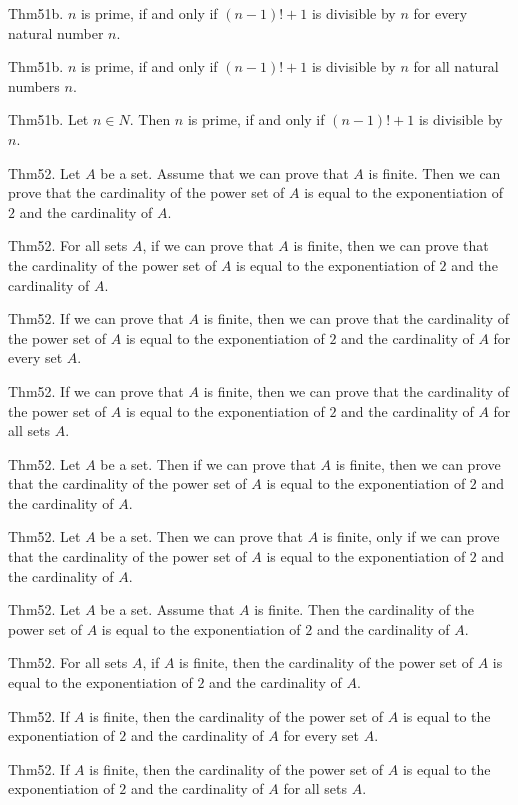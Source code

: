 \documentclass{article}
\begin{document}
Thm51b. $n$ is prime, if and only if $(n - 1)! + 1$ is divisible by $n$ for every natural number $n$.

Thm51b. $n$ is prime, if and only if $(n - 1)! + 1$ is divisible by $n$ for all natural numbers $n$.

Thm51b. Let $n \in N$. Then $n$ is prime, if and only if $(n - 1)! + 1$ is divisible by $n$.

Thm52. Let $A$ be a set. Assume that we can prove that $A$ is finite. Then we can prove that the cardinality of the power set of $A$ is equal to the exponentiation of $2$ and the cardinality of $A$.

Thm52. For all sets $A$, if we can prove that $A$ is finite, then we can prove that the cardinality of the power set of $A$ is equal to the exponentiation of $2$ and the cardinality of $A$.

Thm52. If we can prove that $A$ is finite, then we can prove that the cardinality of the power set of $A$ is equal to the exponentiation of $2$ and the cardinality of $A$ for every set $A$.

Thm52. If we can prove that $A$ is finite, then we can prove that the cardinality of the power set of $A$ is equal to the exponentiation of $2$ and the cardinality of $A$ for all sets $A$.

Thm52. Let $A$ be a set. Then if we can prove that $A$ is finite, then we can prove that the cardinality of the power set of $A$ is equal to the exponentiation of $2$ and the cardinality of $A$.

Thm52. Let $A$ be a set. Then we can prove that $A$ is finite, only if we can prove that the cardinality of the power set of $A$ is equal to the exponentiation of $2$ and the cardinality of $A$.

Thm52. Let $A$ be a set. Assume that $A$ is finite. Then the cardinality of the power set of $A$ is equal to the exponentiation of $2$ and the cardinality of $A$.

Thm52. For all sets $A$, if $A$ is finite, then the cardinality of the power set of $A$ is equal to the exponentiation of $2$ and the cardinality of $A$.

Thm52. If $A$ is finite, then the cardinality of the power set of $A$ is equal to the exponentiation of $2$ and the cardinality of $A$ for every set $A$.

Thm52. If $A$ is finite, then the cardinality of the power set of $A$ is equal to the exponentiation of $2$ and the cardinality of $A$ for all sets $A$.
\end{document}
